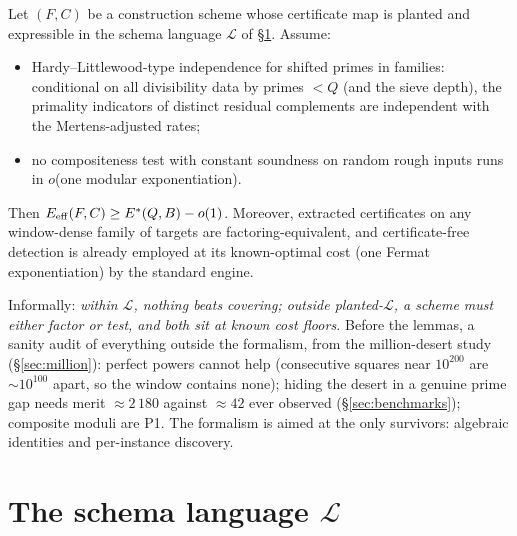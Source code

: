 \begin{theorem}\label{thm:closure}
Let $(F,C)$ be a construction scheme whose certificate map is planted
and expressible in the schema language $\mathcal L$ of
\S\ref{sec:grammar}. Assume:
\begin{itemize}
\item[\emph{(H1)}] Hardy--Littlewood-type independence for shifted
primes in families: conditional on all divisibility data by primes
$<Q$ (and the sieve depth), the primality indicators of distinct
residual complements are independent with the Mertens-adjusted rates;
\item[\emph{(H2)}] no compositeness test with constant soundness on
random rough inputs runs in $o$(one modular exponentiation).
\end{itemize}
Then $E_{\mathrm{eff}}(F,C)\ge E^*(Q,B)-o(1)$. Moreover, extracted
certificates on any window-dense family of targets are
factoring-equivalent, and certificate-free detection is already
employed at its known-optimal cost (one Fermat exponentiation) by the
standard engine.
\end{theorem}

Informally: \emph{within $\mathcal L$, nothing beats covering; outside
planted-$\mathcal L$, a scheme must either factor or test, and both sit
at known cost floors.} Before the lemmas, a sanity audit of everything
outside the formalism, from the million-desert study
(\S\ref{sec:million}): perfect powers cannot help (consecutive squares
near $10^{200}$ are $\sim10^{100}$ apart, so the window contains none);
hiding the desert in a genuine prime gap needs merit $\approx2\,180$
against $\approx42$ ever observed (\S\ref{sec:benchmarks}); composite
moduli are P1. The formalism is aimed at the only survivors: algebraic
identities and per-instance discovery.

\section{The schema language $\mathcal L$}\label{sec:grammar}

